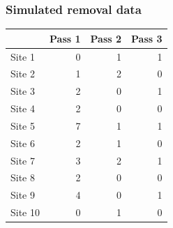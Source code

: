 \documentclass[color=usenames,dvipsnames]{beamer}\usepackage[]{graphicx}\usepackage[]{xcolor}
\newenvironment{knitrout}{}{} %
\begin{document}
\begin{frame}[fragile]
  \frametitle{Simulated removal data}
\begin{knitrout}
\color{fgcolor}\begin{table}

\begin{tabular}{lrrr}
\toprule
  & Pass 1 & Pass 2 & Pass 3\\
\midrule
Site 1 & 0 & 1 & 1\\
Site 2 & 1 & 2 & 0\\
Site 3 & 2 & 0 & 1\\
Site 4 & 2 & 0 & 0\\
Site 5 & 7 & 1 & 1\\
\addlinespace
Site 6 & 2 & 1 & 0\\
Site 7 & 3 & 2 & 1\\
Site 8 & 2 & 0 & 0\\
Site 9 & 4 & 0 & 1\\
Site 10 & 0 & 1 & 0\\
\bottomrule
\end{tabular}
\end{table}

\end{knitrout}
\end{frame}
\end{document}
